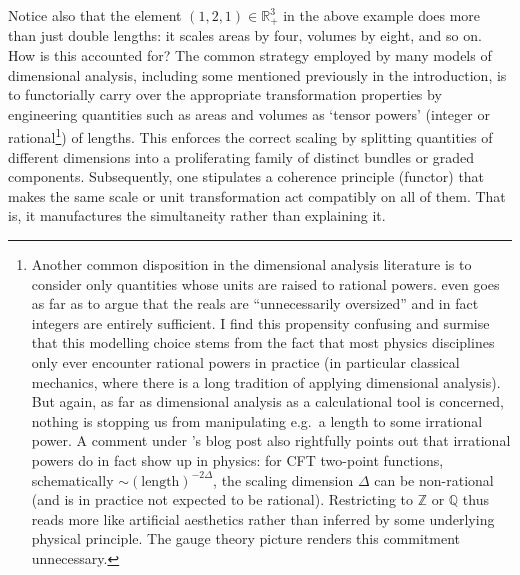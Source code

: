 \documentclass[12pt]{article}
\numberwithin{equation}{section}
\newcommand{\R}{\mathbb{R}}
\begin{document}
Notice also that the element $(1,2,1)\in \R_+^3$ in the above example does more than just double lengths: it scales areas by four, volumes by eight, and so on. How is this accounted for? The common strategy employed by many models of dimensional analysis, including some mentioned previously in the introduction, is to functorially carry over the appropriate transformation properties by engineering quantities such as areas and volumes as `tensor powers' (integer or rational\footnote{Another common disposition in the dimensional analysis literature is to consider only quantities whose units are raised to rational powers. \citet[p.~71]{Raposo2019} even goes as far as to argue that the reals are ``unnecessarily oversized'' and in fact integers are entirely sufficient. I find this propensity confusing and surmise that this modelling choice stems from the fact that most physics disciplines only ever encounter rational powers in practice (in particular classical mechanics, where there is a long tradition of applying dimensional analysis). But again, as far as dimensional analysis as a calculational tool is concerned, nothing is stopping us from manipulating e.g.~a length to some irrational power. A comment under \citeauthor{Tao2012}'s blog post also rightfully points out that irrational powers do in fact show up in physics: for CFT two-point functions, schematically $\sim (\text{length})^{-2\Delta}$, the scaling dimension $\Delta$ can be non-rational (and is in practice not expected to be rational). Restricting to $\mathbb{Z}$ or $\mathbb{Q}$ thus reads more like artificial aesthetics rather than inferred by some underlying physical principle. The gauge theory picture renders this commitment unnecessary.}) of lengths. This enforces the correct scaling by splitting quantities of different dimensions into a proliferating family of distinct bundles or graded components. Subsequently, one stipulates a coherence principle (functor) that makes the same scale or unit transformation act compatibly on all of them. That is, it manufactures the simultaneity rather than explaining it.\\
\end{document}
